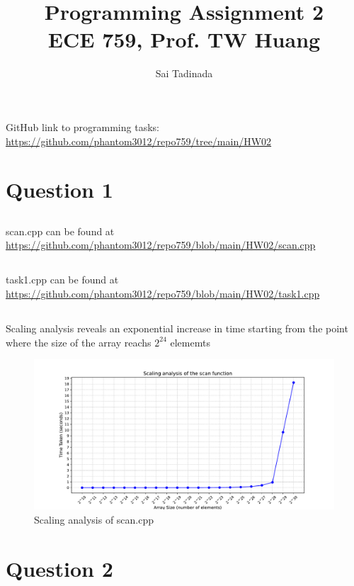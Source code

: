 \documentclass[12pt]{article}
\title{Programming Assignment 2 \\ \small{ECE 759, Prof. TW Huang}}
\author{Sai Tadinada}
\date{}
\begin{document}
\maketitle

GitHub link to programming tasks: \\ \url{https://github.com/phantom3012/repo759/tree/main/HW02}

\section{Question 1}
\subsection{}
scan.cpp can be found at \url{https://github.com/phantom3012/repo759/blob/main/HW02/scan.cpp}

\subsection{}
task1.cpp can be found at \url{https://github.com/phantom3012/repo759/blob/main/HW02/task1.cpp}

\subsection{}
Scaling analysis reveals an exponential increase in time starting from the point where the size of the array reachs $2^{24}$ elememts
\begin{figure}[ht]
    \includegraphics[width = \textwidth]{scan_scaling_analysis.pdf}
    \caption{Scaling analysis of scan.cpp}
\end{figure}

\section{Question 2}
\end{document}
